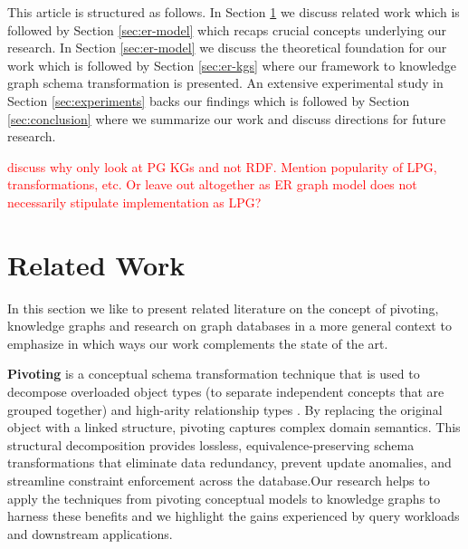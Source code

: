 \documentclass[sigconf]{acmart}
\begin{document}
This article is structured as follows. In Section \ref{sec:related} we discuss related work which is followed by Section \ref{sec:er-model} which recaps crucial concepts underlying our research. In Section \ref{sec:er-model} we discuss the theoretical foundation for our work which is followed by Section \ref{sec:er-kgs} where our framework to knowledge graph schema transformation is presented. An extensive experimental study in Section \ref{sec:experiments} backs our findings which is followed by Section \ref{sec:conclusion} where we summarize our work and discuss directions for future research.


\textcolor{red}{discuss why only look at PG KGs and not RDF. Mention popularity of LPG, transformations, etc. Or leave out altogether as ER graph model does not necessarily stipulate implementation as LPG?}








\section{Related Work}\label{sec:related}


In this section we like to present related literature on the concept of pivoting, knowledge graphs and research on graph databases in a more general context to emphasize in which ways our work complements the state of the art.

\textbf{Pivoting} is a conceptual schema \cite{Thalheim_00_ERM} transformation technique that is used to decompose overloaded object types (to separate independent concepts that are grouped together) and high-arity relationship types \cite{Biskup_96_Decomposition_of_Relationships_Pivoting, Hartmann_01_Decomposing_Relationship_Types_Pivoting}. By replacing the original object with a linked structure, pivoting captures complex domain semantics. This structural decomposition provides lossless, equivalence-preserving schema transformations that eliminate data redundancy, prevent update anomalies, and streamline constraint enforcement across the database.Our research helps to apply the techniques from pivoting conceptual models to knowledge graphs to harness these benefits and we highlight the gains experienced by query workloads and downstream applications.
\end{document}
